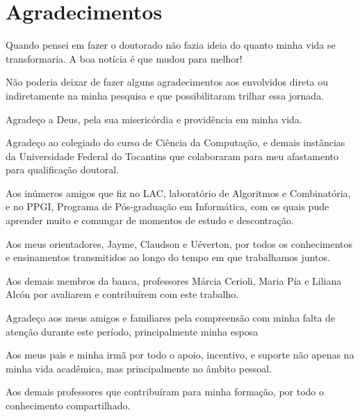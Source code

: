 \chapter*{Agradecimentos}

Quando pensei em fazer o doutorado não fazia ideia do quanto minha vida se transformaria. A boa notícia é que mudou para melhor!

Não poderia deixar de fazer alguns agradecimentos aos envolvidos direta ou indiretamente na minha pesquisa e que possibilitaram trilhar essa jornada. 

Agradeço a Deus, pela sua misericórdia e providência em minha vida.

Agradeço ao colegiado do curso de Ciência da Computação, e demais instâncias da Universidade Federal do Tocantins que colaboraram para meu afastamento para qualificação doutoral.

Aos inúmeros amigos que fiz no LAC, laboratório de Algoritmos e Combinatória, e no PPGI, Programa de Pós-graduação em Informática, com os quais pude aprender muito e comungar de momentos de estudo e descontração.

Aos meus orientadores, Jayme, Claudson e Uéverton, por todos os conhecimentos e ensinamentos transmitidos ao longo do tempo em que trabalhamos juntos.

Aos demais membros da banca, professores Márcia Cerioli, Maria Pía e Liliana Alcón por avaliarem e contribuírem com este trabalho.


Agradeço aos meus amigos e familiares pela compreensão com minha falta de atenção durante este período, principalmente minha esposa


Aos meus pais e minha irmã por todo o apoio, incentivo, e suporte não apenas na minha vida acadêmica, mas principalmente no âmbito pessoal.

Aos demais professores que contribuíram para minha formação, por todo o conhecimento compartilhado.
